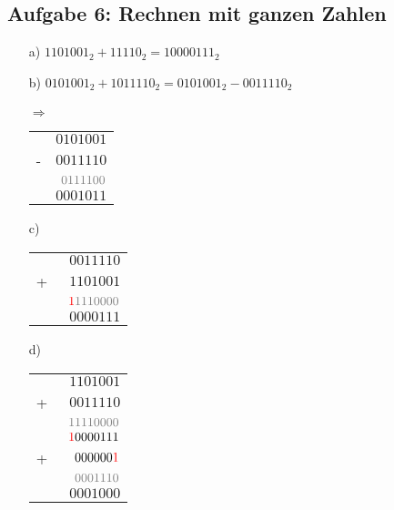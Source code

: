 \documentclass{article}
\begin{document}
    \subsection*{Aufgabe 6: Rechnen mit ganzen Zahlen}
    \begin{enumerate}
        \item[a)] $1101001_2 + 11110_2 = 10000111_2$
        \item[b)] $0101001_2 + 1011110_2 = 0101001_2 - 0011110_2$ \\\\
        $\Rightarrow$ 
        \begin{tabular}{cr}
             &$0101001$	\\
            -&$0011110$ \\
             &$\color{gray}0111100$ \\
             \hline
             &$0001011$
        \end{tabular}  
        \item[c)] \hfill \\
        \begin{tabular}{cr}
            &$\phantom{0}0011110$	\\
           +&$\phantom{0}1101001$	\\
            &$\color{gray}\textcolor{red}{1}1110000$  \\
           \hline
            &$\phantom{0}0000111$
        \end{tabular}  
        \item[d)]  \hfill \\
        \begin{tabular}{cr}
            &$\phantom{0}1101001$	\\
           +&$\phantom{0}0011110$	\\
            &$\color{gray}11110000$  \\
           \hline
            &$\textcolor{red}{1}0000111$ \\
           +&$\phantom{0}000000\textcolor{red}{1}$ \\
            &$\color{gray}\phantom{0}0001110$ \\
           \hline
            &$\phantom{0}0001000$
        \end{tabular} 
    \end{enumerate}
\end{document}
